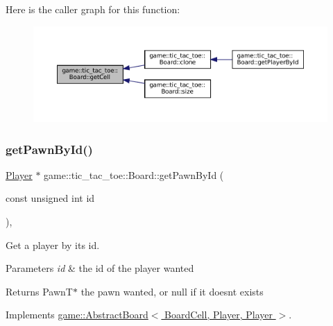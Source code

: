 Here is the caller graph for this function\+:
\nopagebreak
\begin{figure}[H]
\begin{center}
\leavevmode
\includegraphics[width=350pt]{classgame_1_1tic__tac__toe_1_1_board_ab5c00479b4dabd60bef9ea00fce23779_icgraph}
\end{center}
\end{figure}
\mbox{\label{classgame_1_1tic__tac__toe_1_1_board_a7f11ea8d48d9613057dd8164a7610f9a}} 
\subsubsection{\texorpdfstring{get\+Pawn\+By\+Id()}{getPawnById()}}
{\footnotesize\ttfamily \hyperlink{classgame_1_1tic__tac__toe_1_1_player}{Player} $\ast$ game\+::tic\+\_\+tac\+\_\+toe\+::\+Board\+::get\+Pawn\+By\+Id (\begin{DoxyParamCaption}\item[{const unsigned int}]{id }\end{DoxyParamCaption})\hspace{0.3cm}{\ttfamily [override]}, {\ttfamily [virtual]}}



Get a player by it\textquotesingle{}s id. 


\begin{DoxyParams}{Parameters}
{\em id} & the id of the player wanted \\
\hline
\end{DoxyParams}
\begin{DoxyReturn}{Returns}
Pawn\+T$\ast$ the pawn wanted, or null if it doesn\textquotesingle{}t exists 
\end{DoxyReturn}


Implements \hyperlink{classgame_1_1_abstract_board_a5d80fa5f0809c746349fc1bab1d8999b}{game\+::\+Abstract\+Board$<$ Board\+Cell, Player, Player $>$}.

